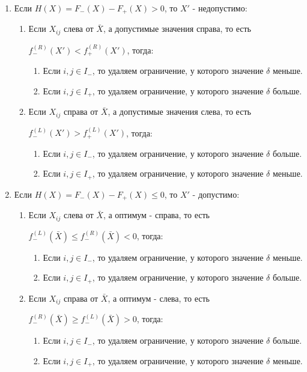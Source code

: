 \documentclass[12pt,a4paper]{article}
\begin{document}
\begin{enumerate}
\item Если $H(X)=F_{-}(X)-F_{+}(X)>0$, то $X'$ - недопустимо:
\begin{enumerate}
\item Если $X_{ij}$ слева от  $\bar X$, а допустимые значения справа, то есть\par  $f_{-}^{(R)}(X')<f_{+}^{(R)}(X')$, тогда:
\begin{enumerate}
\item Если $i,j \in I_{-}$, то удаляем ограничение, у которого значение $\delta$ меньше.
\item Если $i,j \in I_{+}$, то удаляем ограничение, у которого значение $\delta$ больше.
\end{enumerate}
\item Если $X_{ij}$ справа от  $\bar X$, а допустимые значения слева, то есть\par $f_{-}^{(L)}(X')>f_{+}^{(L)}(X')$, тогда:
\begin{enumerate} 
\item Если $i,j \in I_{-}$, то удаляем ограничение, у которого значение $\delta$ больше.
\item Если $i,j \in I_{+}$, то удаляем ограничение, у которого значение $\delta$ меньше.
\end{enumerate}
\end{enumerate}
\item Если $H(X)=F_{-}(X)-F_{+}(X)\leqslant 0$, то $X'$ - допустимо:
\begin{enumerate}
\item Если $X_{ij}$ слева от  $\bar X$, а оптимум - справа, то есть\par  $f_{-}^{(L)}(\bar X)\leqslant f_{-}^{(R)}(\bar X)<0$, тогда:
\begin{enumerate}
\item Если $i,j \in I_{-}$, то удаляем ограничение, у которого значение $\delta$ меньше.
\item Если $i,j \in I_{+}$, то удаляем ограничение, у которого значение $\delta$ больше.
\end{enumerate}
\item Если $X_{ij}$ справа от  $\bar X$, а оптимум - слева, то есть\par $f_{-}^{(R)}(\bar X)\geqslant f_{-}^{(L)}(\bar X)>0$, тогда:
\begin{enumerate} 
\item Если $i,j \in I_{-}$, то удаляем ограничение, у которого значение $\delta$ больше.
\item Если $i,j \in I_{+}$, то удаляем ограничение, у которого значение $\delta$ меньше.
\end{enumerate}
\end{enumerate}
\end{enumerate}
\end{document}

